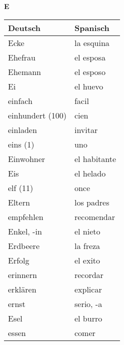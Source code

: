 \begin{flushright}\begin{Huge}\textbf{E}\end{Huge}\end{flushright}

\begin{longtable}{p{} p{}} 
\textbf{Deutsch}     & \textbf{Spanisch}                                       \\ \hline
\hline
\endhead %
Ecke & la esquina \\
Ehefrau &  el esposa\\
Ehemann & el esposo\\
Ei & el huevo\\
einfach & facil\\
einhundert (100) & cien\\
einladen & invitar\\
eins (1) & uno\\
Einwohner & el habitante\\
Eis & el helado\\
elf (11) & once\\
Eltern & los padres\\
empfehlen & recomendar\\
Enkel, -in & el nieto\\
Erdbeere & la freza\\
Erfolg & el exito\\
erinnern & recordar\\
erklären & explicar\\
ernst & serio, -a\\
Esel & el burro\\
essen & comer \\

\end{longtable}
